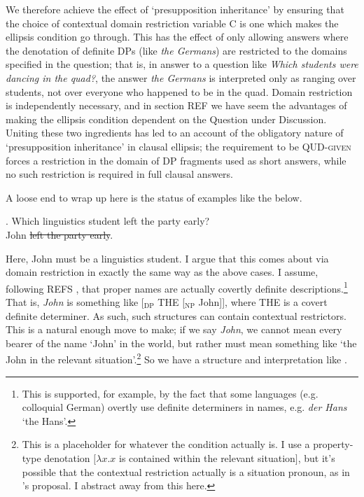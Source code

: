 \documentclass[doublespace]{umthesis}
\newcommand{\el}[1]{\sout{#1}}
\begin{document}
We therefore achieve the effect of `presupposition inheritance' by ensuring that the choice of contextual domain restriction variable C is one which makes the ellipsis condition go through.
This has the effect of only allowing answers where the denotation of definite DPs (like {\it the Germans}) are restricted to the domains specified in the question; that is, in answer to a question like {\it Which students were dancing in the quad?}, the answer {\it the Germans} is interpreted only as ranging over students, not over everyone who happened to be in the quad.
Domain restriction is independently necessary, and in section REF %
we have seem the advantages of making the ellipsis condition dependent on the Question under Discussion.
Uniting these two ingredients has led to an account of the obligatory nature of `presupposition inheritance' in clausal ellipsis; the requirement to be \textsc{QUD-given} forces a restriction in the domain of DP fragments used as short answers, while no such restriction is required in full clausal answers.

A loose end to wrap up here is the status of examples like the below.

\ex. 	Which linguistics student left the party early?\\
	John \el{left the party early}.
	
Here, John must be a linguistics student.
I argue that this comes about via domain restriction in exactly the same way as the above cases.
I assume, following REFS %
, that proper names are actually covertly definite descriptions.\footnote{This is supported, for example, by the fact that some languages (e.g. colloquial German) overtly use definite determiners in names, e.g. {\it der Hans} `the Hans'.}
That is, {\it John} is something like [$_{\mathrm{DP}}$ THE [$_{\mathrm{NP}}$ John]], where THE is a covert definite determiner.
As such, such structures can contain contextual restrictors.
This is a natural enough move to make; if we say {\it John}, we cannot mean every bearer of the name `John' in the world, but rather must mean something like `the John in the relevant situation'.\footnote{This is a placeholder for whatever the condition actually is.
I use a property-type denotation $[\lambda x. x $ is contained within the relevant situation$]$, but it's possible that the contextual restriction actually is a situation pronoun, as in \cite{Kr04DomRest}'s proposal. 
I abstract away from this here.}
So we have a structure and interpretation like \Next.
\end{document}
